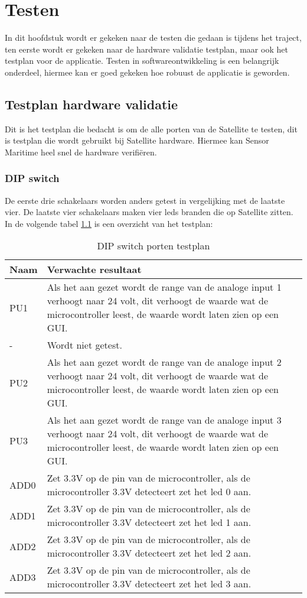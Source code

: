 \chapter{Testen}
In dit hoofdstuk wordt er gekeken naar de testen die gedaan is tijdens het traject, ten eerste wordt er gekeken naar de hardware validatie testplan, maar ook het testplan voor de applicatie. Testen in softwareontwikkeling is een belangrijk onderdeel, hiermee kan er goed gekeken hoe robuust de applicatie is geworden.

\section{Testplan hardware validatie} \label{sec:hwtestplan}
Dit is het testplan die bedacht is om de alle porten van de Satellite te testen, dit is testplan die wordt gebruikt bij Satellite hardware. Hiermee kan Sensor Maritime heel snel de hardware verifiëren.
\subsection{DIP switch}
De eerste drie schakelaars worden anders getest in vergelijking met de laatste vier. De laatste vier schakelaars maken vier leds branden die op Satellite zitten. In de volgende tabel \ref{tab:hw_val_dip_testplan} is een overzicht van het testplan:
\begin{table}[h!]
	\caption{DIP switch porten testplan}
	\begin{tabular}{lp{14.5cm}}
	\toprule
	\textbf{Naam} 	& \textbf{Verwachte resultaat} \\ \toprule
	PU1				& Als het aan gezet wordt de range van de analoge input 1 verhoogt naar 24 volt, dit verhoogt de waarde wat de microcontroller leest, de waarde wordt laten zien op een GUI.\\
	-				& Wordt niet getest. \\
	PU2				& Als het aan gezet wordt de range van de analoge input 2 verhoogt naar 24 volt, dit verhoogt de waarde wat de microcontroller leest, de waarde wordt laten zien op een GUI.\\
	PU3				& Als het aan gezet wordt de range van de analoge input 3 verhoogt  naar 24 volt, dit verhoogt de waarde wat de microcontroller leest, de waarde wordt laten zien op een GUI. \\
	ADD0 			& Zet 3.3V op de pin van de microcontroller, als de microcontroller 3.3V detecteert zet het led 0 aan.\\
	ADD1 			& Zet 3.3V op de pin van de microcontroller, als de microcontroller 3.3V detecteert zet het led 1 aan.\\
	ADD2 			& Zet 3.3V op de pin van de microcontroller, als de microcontroller 3.3V detecteert zet het led 2 aan.\\
	ADD3 			& Zet 3.3V op de pin van de microcontroller, als de microcontroller 3.3V detecteert zet het led 3 aan.\\ \bottomrule
	\end{tabular}
	\label{tab:hw_val_dip_testplan}
\end{table}

